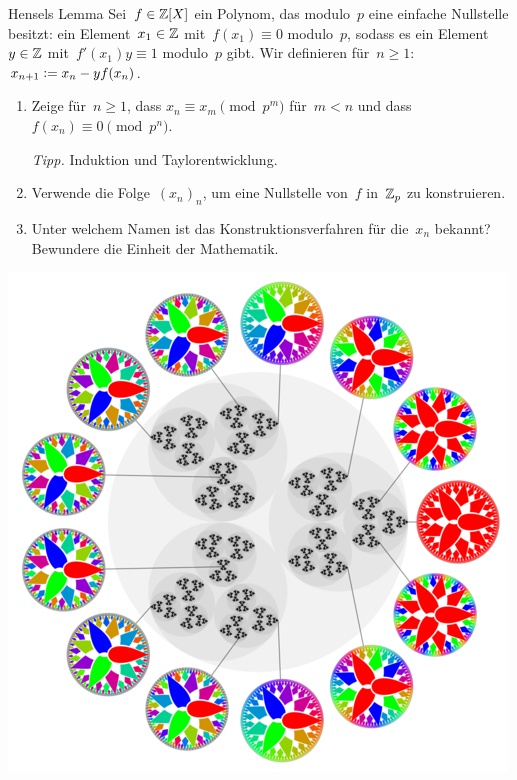 \documentclass[entwurf]{uebblatt}
\begin{document}
\begin{aufgabe}{Hensels Lemma}
Sei~$f \in \mathbb{Z}[X]$ ein
Polynom, das modulo~$p$ eine einfache Nullstelle besitzt: ein Element~$x_1
\in \mathbb{Z}$ mit~$f(x_1) \equiv 0$ modulo~$p$, sodass es ein Element~$y \in \mathbb{Z}$
mit~$f'(x_1) y \equiv 1$ modulo~$p$ gibt.
Wir definieren für~$n \geq 1$: $x_{n+1} \vcentcolon= x_n - y f(x_n)$.
\begin{enumerate}
\item Zeige für~$n \geq 1$, dass $x_n \equiv x_m \pmod{p^m}$ für~$m < n$ und dass~$f(x_n) \equiv 0 \pmod{p^n}$.

{\tiny\emph{Tipp.} Induktion und Taylorentwicklung.\par}
\item Verwende die Folge~$(x_n)_n$, um eine Nullstelle von~$f$ in~$\mathbb{Z}_p$ zu
konstruieren.
\item Unter welchem Namen ist das Konstruktionsverfahren für die~$x_n$ bekannt?
Bewundere die Einheit der Mathematik.
\end{enumerate}
\end{aufgabe}

{\centering\href{https://en.wikipedia.org/wiki/P-adic_number}{\includegraphics[scale=0.24]{images/p-adic-numbers}}\par}
\end{document}
